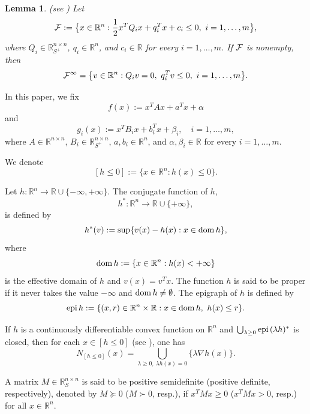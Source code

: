 \documentclass[]{interact}
\theoremstyle{plain}%
\newtheorem{lemma}[theorem]{Lemma}
\theoremstyle{definition}
\theoremstyle{remark}
\begin{document}
	\begin{lemma}\label{lemmanlx} {\rm (see \cite{BK02})}
		Let
		\begin{equation}\label{rb}
			{\cal F}:=\big\{x\in \mathbb{R}^n:
			\dfrac{1}{2}x^TQ_ix+q_i^Tx+c_i \leq 0,\ i=1,\ldots,m\big\},
		\end{equation}
		where
		$Q_i \in\mathbb{R}^{n \times n}_{S^{+}}$, $q_i\in \mathbb{R}^n$, and $c_i\in \mathbb{R}$
		for every $i=1,\ldots,m$.
		If ${\cal F}$ is nonempty, then
		\begin{equation}\label{c1a}
			{\cal F}^\infty
			=\big\{v\in \mathbb{R}^n : Q_iv=0,\ q_i^Tv \leq 0,\ i=1,\ldots,m\big\}.
		\end{equation}
	\end{lemma}
	
	In this paper, we fix
	$$
	f(x):=x^TAx+a^Tx+\alpha
	$$
	and
	$$
	g_i(x):=x^TB_ix+b_i^Tx+\beta_i,\quad i=1,\ldots,m,
	$$
	where
	$A\in \mathbb{R}^{n \times n}$,
	$B_i \in\mathbb{R}^{n \times n}_{S^{+}}$,
	$a,b_i\in \mathbb{R}^n$, and $\alpha, \beta_i\in \mathbb{R}$
	for every $i=1,\ldots,m$.
	
	We denote
	$$
	[h\leq 0]:=\{x\in \mathbb{R}^n : h(x)\leq 0\}.
	$$
	
	Let $h:\mathbb{R}^n \rightarrow \mathbb{R}\cup\{-\infty,+\infty\}$.
	The conjugate function of $h$,
	$$
	h^*:\mathbb{R}^n \rightarrow \mathbb{R}\cup\{+\infty\},
	$$
	is defined by
	$$
	h^*(v):=\sup\{v(x)-h(x): x\in {\rm dom}\, h\},
	$$
	where
	$$
	{\rm dom}\, h:=\{x\in \mathbb{R}^n : h(x)<+\infty\}
	$$
	is the effective domain of $h$ and $v(x)=v^Tx$.
	The function $h$ is said to be proper if it never takes the value $-\infty$
	and ${\rm dom}\, h\neq \emptyset$.
	The epigraph of $h$ is defined by
	$$
	{\rm epi}\, h:=\{(x,r)\in \mathbb{R}^n\times \mathbb{R} :
	x\in {\rm dom}\, h,\ h(x)\leq r\}.
	$$
	
	If $h$ is a continuously differentiable convex function on $\mathbb{R}^n$
	and $\bigcup_{\lambda\geq 0} {\rm epi}\, (\lambda h)^*$ is closed, then for each
	$x\in [h\leq 0]$ (see \cite{JeyakumarLee2008}), one has
	\begin{equation}\label{h4}
		N_{[h\leq 0]}(x)
		=\bigcup_{\lambda\geq 0,\ \lambda h(x)=0} \{\lambda \nabla h(x)\}.
	\end{equation}
	
	A matrix $M\in \mathbb{R}^{n \times n}_{S}$ is said to be positive semidefinite
	(positive definite, respectively), denoted by $M\succeq 0$ ($M\succ 0$, resp.),
	if $x^TMx\geq 0$ ($x^TMx>0$, resp.) for all $x\in \mathbb{R}^n$.
	
\end{document}
